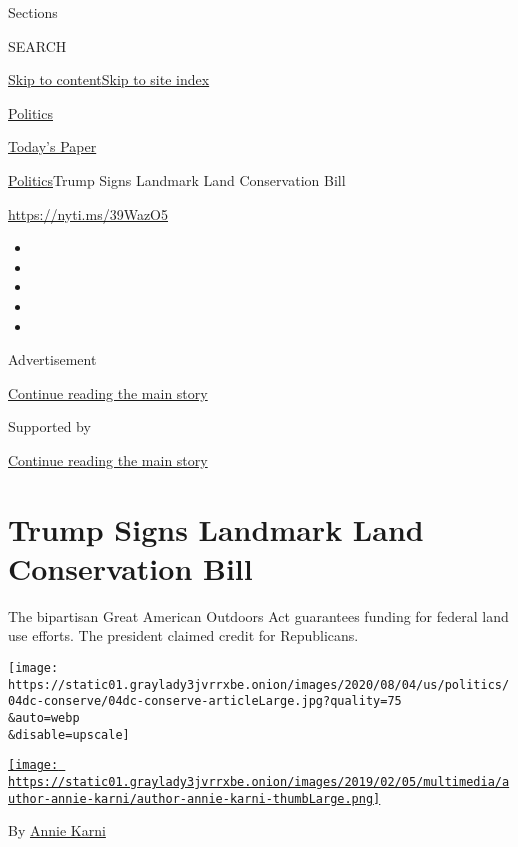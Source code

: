Sections

SEARCH

\protect\hyperlink{site-content}{Skip to
content}\protect\hyperlink{site-index}{Skip to site index}

\href{https://www.nytimes3xbfgragh.onion/section/politics}{Politics}

\href{https://myaccount.nytimes3xbfgragh.onion/auth/login?response_type=cookie\&client_id=vi}{}

\href{https://www.nytimes3xbfgragh.onion/section/todayspaper}{Today's
Paper}

\href{/section/politics}{Politics}\textbar{}Trump Signs Landmark Land
Conservation Bill

\url{https://nyti.ms/39WazO5}

\begin{itemize}
\item
\item
\item
\item
\item
\end{itemize}

Advertisement

\protect\hyperlink{after-top}{Continue reading the main story}

Supported by

\protect\hyperlink{after-sponsor}{Continue reading the main story}

\hypertarget{trump-signs-landmark-land-conservation-bill}{%
\section{Trump Signs Landmark Land Conservation
Bill}\label{trump-signs-landmark-land-conservation-bill}}

The bipartisan Great American Outdoors Act guarantees funding for
federal land use efforts. The president claimed credit for Republicans.

\texttt{[image: https://static01.graylady3jvrrxbe.onion/images/2020/08/04/us/politics/04dc-conserve/04dc-conserve-articleLarge.jpg?quality=75\\\&auto=webp\\\&disable=upscale]}

\href{https://www.nytimes3xbfgragh.onion/by/annie-karni}{\texttt{[image: https://static01.graylady3jvrrxbe.onion/images/2019/02/05/multimedia/author-annie-karni/author-annie-karni-thumbLarge.png]}}

By \href{https://www.nytimes3xbfgragh.onion/by/annie-karni}{Annie Karni}

